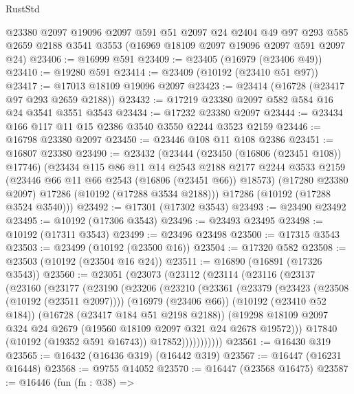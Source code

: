 \begin{lexlean}{RustStd}
\begin{coremodule}
    @23380
    @2097
    @19096
    @2097
    @591
    @51
    @2097
    @24
    @2404
    @49
    @97
    @293
    @585
    @2659
    @2188
    @3541
    @3553
    (@16969 @18109 @2097 @19096 @2097 @591 @2097 @24)
@23406 := @16999 @591
@23409 := @23405 (@16979 (@23406 @49))
@23410 := @19280 @591
@23414 := @23409 (@10192 (@23410 @51 @97))
@23417 := @17013 @18109 @19096 @2097
@23423 := @23414 (@16728 (@23417 @97 @293 @2659 @2188))
@23432 := @17219 @23380 @2097 @582 @584 @16 @24 @3541 @3551 @3543
@23434 := @17232 @23380 @2097
@23444 := @23434 @166 @117 @11 @15 @2386 @3540 @3550 @2244 @3523 @2159
@23446 := @16798 @23380 @2097
@23450 := @23446 @108 @11 @108 @2386
@23451 := @16807 @23380
@23490 := @23432
    (@23444
      (@23450 (@16806 (@23451 @108)) @17746)
      (@23434
        @115
        @86
        @11
        @14
        @2543
        @2188
        @2177
        @2244
        @3533
        @2159
        (@23446 @66 @11 @66 @2543 (@16806 (@23451 @66)) @18573)
        (@17280 @23380 @2097)
        @17286
        (@10192 (@17288 @3534 @2188)))
      @17286
      (@10192 (@17288 @3524 @3540)))
@23492 := @17301 (@17302 @3543)
@23493 := @23490 @23492
@23495 := @10192 (@17306 @3543)
@23496 := @23493 @23495
@23498 := @10192 (@17311 @3543)
@23499 := @23496 @23498
@23500 := @17315 @3543
@23503 := @23499 (@10192 (@23500 @16))
@23504 := @17320 @582
@23508 := @23503 (@10192 (@23504 @16 @24))
@23511 := @16890 (@16891 (@17326 @3543))
@23560 := @23051
    (@23073
      (@23112
        (@23114
          (@23116
            (@23137
              (@23160
                (@23177
                  (@23190
                    (@23206
                      (@23210
                        (@23361
                          (@23379
                            (@23423 (@23508 (@10192 (@23511 @2097))))
                            (@16979 (@23406 @66))
                            (@10192 (@23410 @52 @184))
                            (@16728 (@23417 @184 @51 @2198 @2188))
                            (@19298
                              @18109
                              @2097
                              @324
                              @24
                              @2679
                              (@19560 @18109 @2097 @321 @24 @2678 @19572)))
                          @17840
                          (@10192 (@19352 @591 @16743))
                          @17852)))))))))))
@23561 := @16430 @319
@23565 := @16432 (@16436 @319) (@16442 @319)
@23567 := @16447 (@16231 @16448)
@23568 := @9755 @14052
@23570 := @16447 (@23568 @16475)
@23587 := @16446
    (fun (fn : @38) =>

\end{coremodule}
\end{lexlean}
